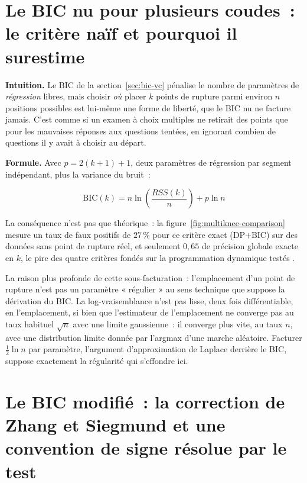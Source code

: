 \documentclass[11pt]{article}
\begin{document}
\section{Le BIC nu pour plusieurs coudes~: le critère naïf et pourquoi il surestime}
\label{sec:several-bic}

\textbf{Intuition.} Le BIC de la section~\ref{sec:bic-vc} pénalise le
nombre de paramètres de \emph{régression} libres, mais choisir \emph{où}
placer $k$ points de rupture parmi environ $n$ positions possibles est
lui-même une forme de liberté, que le BIC nu ne facture jamais. C'est comme
si un examen à choix multiples ne retirait des points que pour les
mauvaises réponses aux questions tentées, en ignorant combien de questions
il y avait à choisir au départ.

\textbf{Formule.} Avec $p = 2(k+1) + 1$, deux paramètres de régression par
segment indépendant, plus la variance du bruit~:

\begin{equation}
\mathrm{BIC}(k) = n \ln\!\left(\frac{RSS(k)}{n}\right) + p \ln n
\end{equation}

La conséquence n'est pas que théorique~: la figure~\ref{fig:multiknee-comparison}
mesure un taux de faux positifs de $27\,\%$ pour ce critère exact
(DP+BIC) sur des données sans point de rupture réel, et seulement
$0{,}65$ de précision globale exacte en $k$, le pire des quatre critères
fondés sur la programmation dynamique testés
\citep{yao1988} \citep{zhangsiegmund2007}.

La raison plus profonde de cette sous-facturation~: l'emplacement d'un
point de rupture n'est pas un paramètre « régulier » au sens technique que
suppose la dérivation du BIC. La log-vraisemblance n'est pas lisse, deux
fois différentiable, en l'emplacement, si bien que l'estimateur de
l'emplacement ne converge pas au taux habituel $\sqrt n$ avec une limite
gaussienne~: il converge plus vite, au taux $n$, avec une distribution
limite donnée par l'argmax d'une marche aléatoire. Facturer
$\frac{1}{2}\ln n$ par paramètre, l'argument d'approximation de Laplace
derrière le BIC, suppose exactement la régularité qui s'effondre ici.

\section{Le BIC modifié~: la correction de Zhang et Siegmund et une convention de signe résolue par le test}
\label{sec:mbic}
\end{document}
